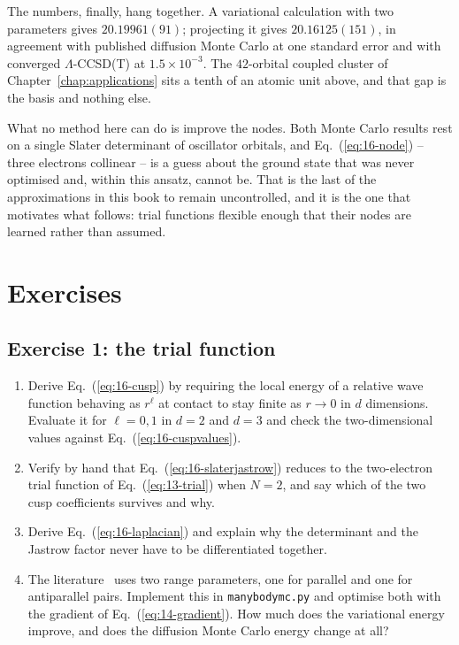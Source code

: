 The numbers, finally, hang together.  A variational calculation with two
parameters gives $20.19961(91)$; projecting it gives $20.16125(151)$, in
agreement with published diffusion Monte Carlo at one standard error and with
converged $\Lambda$-CCSD(T) at $1.5\times10^{-3}$.  The $42$-orbital coupled
cluster of Chapter~\ref{chap:applications} sits a tenth of an atomic unit
above, and that gap is the basis and nothing else.

What no method here can do is improve the nodes.  Both Monte Carlo results rest
on a single Slater determinant of oscillator orbitals, and
Eq.~(\ref{eq:16-node}) -- three electrons collinear -- is a guess about the
ground state that was never optimised and, within this ansatz, cannot be.  That
is the last of the approximations in this book to remain uncontrolled, and it
is the one that motivates what follows: trial functions flexible enough that
their nodes are learned rather than assumed.

\section{Exercises}

\subsection*{Exercise 1: the trial function}
\label{ex:16-trial}

\begin{enumerate}
\item[a)] Derive Eq.~(\ref{eq:16-cusp}) by requiring the local energy of a
  relative wave function behaving as $r^{\ell}$ at contact to stay finite as
  $r\to0$ in $d$ dimensions.  Evaluate it for $\ell=0,1$ in $d=2$ and $d=3$ and
  check the two-dimensional values against Eq.~(\ref{eq:16-cuspvalues}).

\item[b)] Verify by hand that Eq.~(\ref{eq:16-slaterjastrow}) reduces to the
  two-electron trial function of Eq.~(\ref{eq:13-trial}) when $N=2$, and say
  which of the two cusp coefficients survives and why.

\item[c)] Derive Eq.~(\ref{eq:16-laplacian}) and explain why the determinant
  and the Jastrow factor never have to be differentiated together.

\item[d)] The literature~\cite{harju2002} uses two range parameters, one for
  parallel and one for antiparallel pairs.  Implement this in
  \texttt{manybodymc.py} and optimise both with the gradient of
  Eq.~(\ref{eq:14-gradient}).  How much does the variational energy improve,
  and does the diffusion Monte Carlo energy change at all?
\end{enumerate}

